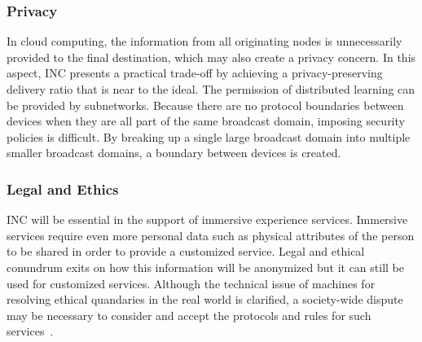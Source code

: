 \subsubsection{Privacy}
In cloud computing, the information from all originating nodes is unnecessarily provided to the final destination, which may also create a privacy concern. In this aspect, INC presents a practical trade-off by achieving a privacy-preserving delivery ratio that is near to the ideal. The permission of distributed learning can be provided by subnetworks. Because there are no protocol boundaries between devices when they are all part of the same broadcast domain, imposing security policies is difficult. By breaking up a single large broadcast domain into multiple smaller broadcast domains, a boundary between devices is created.
 
 \subsubsection{Legal and Ethics}
INC will be essential in the support of immersive experience services. Immersive services require even more personal data such as physical attributes of the person to be shared in order to provide a customized service.  Legal and ethical conundrum exits on how this information will be anonymized but it can still be used for customized services.  Although the technical issue of machines for resolving ethical quandaries in the real world is clarified, a society-wide dispute may be necessary to consider and accept the protocols and rules for such services~\cite{8662743}. 
%
